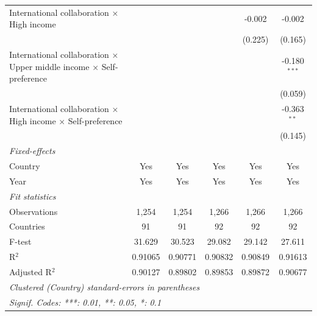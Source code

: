 \begin{table}[H]
\begin{tabular}{lccccc}
      International collaboration × High income                           &               &               &               & -0.002        & -0.002\\   
                                                                          &               &               &               & (0.225)       & (0.165)\\   
      International collaboration × Upper middle income × Self-preference &               &               &               &               & -0.180$^{***}$\\   
                                                                          &               &               &               &               & (0.059)\\   
      International collaboration × High income × Self-preference         &               &               &               &               & -0.363$^{**}$\\   
                                                                          &               &               &               &               & (0.145)\\   
      \midrule
      \emph{Fixed-effects}\\
      Country                                                             & Yes           & Yes           & Yes           & Yes           & Yes\\  
      Year                                                                & Yes           & Yes           & Yes           & Yes           & Yes\\  
      \midrule
      \emph{Fit statistics}\\
      Observations                                                        & 1,254         & 1,254         & 1,266         & 1,266         & 1,266\\  
      Countries                                                           & 91            & 91            & 92            & 92            & 92\\  
      F-test                                                              & 31.629        & 30.523        & 29.082        & 29.142        & 27.611\\  
      R$^2$                                                               & 0.91065       & 0.90771       & 0.90832       & 0.90849       & 0.91613\\  
      Adjusted R$^2$                                                      & 0.90127       & 0.89802       & 0.89853       & 0.89872       & 0.90677\\  
      \midrule \midrule
      \multicolumn{6}{l}{\emph{Clustered (Country) standard-errors in parentheses}}\\
      \multicolumn{6}{l}{\emph{Signif. Codes: ***: 0.01, **: 0.05, *: 0.1}}\\
   \end{tabular}
\end{table}


